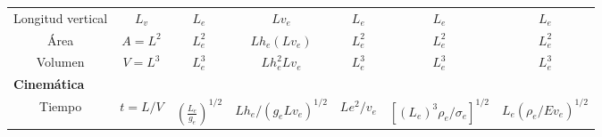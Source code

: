 \begin{table}[h!]
\begin{turn}{90}
\begin{tabular}{@{}ccccccc@{}}
    Longitud vertical                                                              & $L_v$                         & $L_e$                                                                 & $Lv_e$                                                                               & $L_e$                                                                             & $L_e$                                                                           & $L_e$                                   \\
    Área                                                                           & $A=L^2$                       & $L_e^2$                                                               & $Lh_e\left(Lv_e\right)$                                                              & $L_e^2$                                                                           & $L_e^2$                                                                         & $L_e^2$                                 \\
    Volumen                                                                        & $V=L^3$                       & $L_e^3$                                                               & $Lh_e^2Lv_e$                                                                         & $L_e^3$                                                                           & $L_e^3$                                                                         & $L_e^3$                                 \\
    \multicolumn{1}{l}{\textbf{Cinemática}}                                        &                               &                                                                       &                                                                                      &                                                                                   &                                                                                 &                                         \\
    Tiempo                                                                         & $t=L/V$                       & $\left(\frac{L_e}{g_e}\right)^{1/2}$                                  & $Lh_e/\left(g_eLv_e\right)^{1/2}$                                                    & $Le^2/v_e$                                                                        & $\left[\left(L_e\right)^3\rho_e/\sigma_e\right]^{1/2}$                          & $L_e\left(\rho_e/Ev_e\right)^{1/2}$     \\

\end{tabular}
\end{turn}
\end{table}

